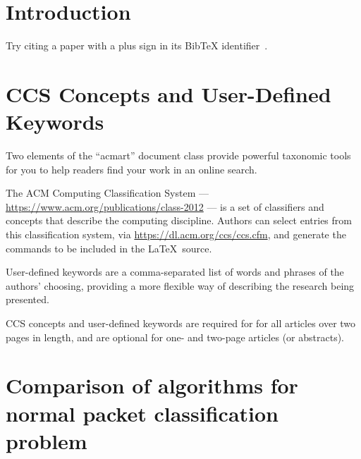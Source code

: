 \documentclass[acmsmall]{acmart}
\begin{document}


\maketitle

\section{Introduction}

Try citing a paper with a plus sign in its BibTeX identifier~\cite{LXLS+2023}.


\section{CCS Concepts and User-Defined Keywords}

Two elements of the ``acmart'' document class provide powerful
taxonomic tools for you to help readers find your work in an online
search.

The ACM Computing Classification System ---
\url{https://www.acm.org/publications/class-2012} --- is a set of
classifiers and concepts that describe the computing
discipline. Authors can select entries from this classification
system, via \url{https://dl.acm.org/ccs/ccs.cfm}, and generate the
commands to be included in the \LaTeX\ source.

User-defined keywords are a comma-separated list of words and phrases
of the authors' choosing, providing a more flexible way of describing
the research being presented.

CCS concepts and user-defined keywords are required for for all
articles over two pages in length, and are optional for one- and
two-page articles (or abstracts).


\section{Comparison of algorithms for normal packet classification problem}
\end{document}

